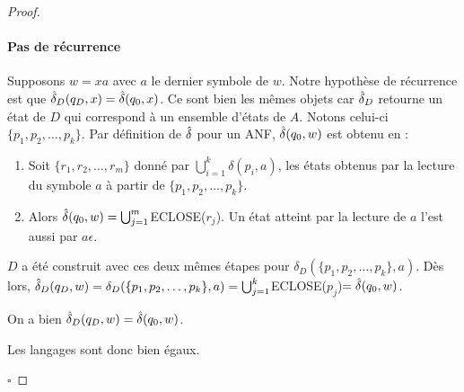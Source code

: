 \begin{proof}
	\paragraph{Pas de récurrence} Supposons $w=xa$ avec $a$ le dernier symbole de $w$. Notre hypothèse de récurrence est que $\hat{\delta}_D(q_D,x)=\hat{\delta}(q_0,x)$. Ce sont bien les mêmes objets car $\hat{\delta}_D$ retourne un état de $D$ qui correspond à un ensemble d'états de $A$. Notons celui-ci $\{p_1,p_2, \dots, p_k\}$. Par définition de $\hat{\delta}$ pour un ANF, $\hat{\delta}(q_0,w)$ est obtenu en :

	\begin{enumerate}
		\item Soit $\{r_1,r_2,\dots, r_m\}$ donné par $\bigcup_{i=1}^k \delta(p_i,a)$, les états obtenus par la lecture du symbole $a$ à partir de $\{p_1,p_2,\dots,p_k\}$.
		\item Alors $\hat{\delta}(q_0,w)=\bigcup_{j=1}^m$ECLOSE($r_j$). Un état atteint par la lecture de $a$ l'est aussi par $a\epsilon$.
	\end{enumerate}

	$D$ a été construit avec ces deux mêmes étapes pour $\delta_D(\{p_1,p_2,\dots, p_k\},a)$. Dès lors, $\hat{\delta}_D(q_D,w)=\delta_D(\{p_1,p_2,\dots, p_k\},a)=\bigcup_{j=1}^k$ECLOSE($p_j$)$=\hat{\delta}(q_0,w)$.

	On a bien $\hat{\delta}_D(q_D,w)=\hat{\delta}(q_0,w)$.

  Les langages sont donc bien égaux.

	\hfill$\square$
\end{proof}



